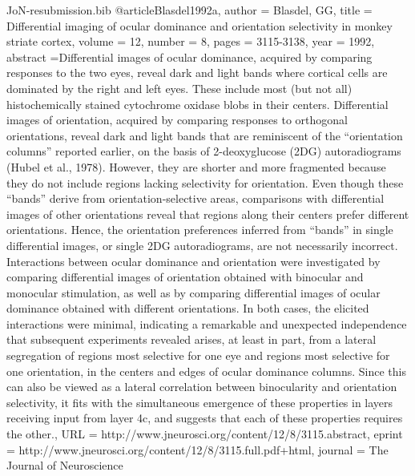\documentclass{article}
\begin{document}
\begin{filecontents}{JoN-resubmission.bib}
@article{Blasdel1992a,
author = {Blasdel, GG},
title = {Differential imaging of ocular dominance and orientation selectivity in monkey striate cortex},
volume = {12},
number = {8},
pages = {3115-3138},
year = {1992},
abstract ={Differential images of ocular dominance, acquired by comparing responses to the two eyes, reveal dark and light bands where cortical cells are dominated by the right and left eyes. These include most (but not all) histochemically stained cytochrome oxidase blobs in their centers. Differential images of orientation, acquired by comparing responses to orthogonal orientations, reveal dark and light bands that are reminiscent of the “orientation columns” reported earlier, on the basis of 2-deoxyglucose (2DG) autoradiograms (Hubel et al., 1978). However, they are shorter and more fragmented because they do not include regions lacking selectivity for orientation. Even though these “bands” derive from orientation-selective areas, comparisons with differential images of other orientations reveal that regions along their centers prefer different orientations. Hence, the orientation preferences inferred from “bands” in single differential images, or single 2DG autoradiograms, are not necessarily incorrect. Interactions between ocular dominance and orientation were investigated by comparing differential images of orientation obtained with binocular and monocular stimulation, as well as by comparing differential images of ocular dominance obtained with different orientations. In both cases, the elicited interactions were minimal, indicating a remarkable and unexpected independence that subsequent experiments revealed arises, at least in part, from a lateral segregation of regions most selective for one eye and regions most selective for one orientation, in the centers and edges of ocular dominance columns. Since this can also be viewed as a lateral correlation between binocularity and orientation selectivity, it fits with the simultaneous emergence of these properties in layers receiving input from layer 4c, and suggests that each of these properties requires the other.},
URL = {http://www.jneurosci.org/content/12/8/3115.abstract},
eprint = {http://www.jneurosci.org/content/12/8/3115.full.pdf+html},
journal = {The Journal of Neuroscience}
}


\end{filecontents}
\end{document}
